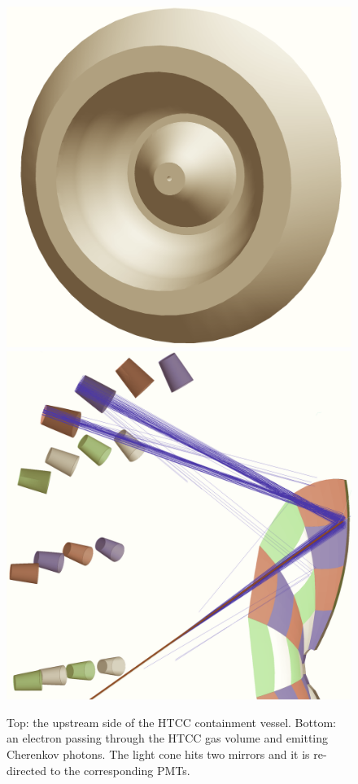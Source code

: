\begin{figure}
	\centering
	\includegraphics[width=0.99\columnwidth,keepaspectratio]{img/htccGeometry.png}
	\includegraphics[width=0.99\columnwidth,keepaspectratio]{img/htccDetail.png}
	\caption{Top: the upstream side of the HTCC containment vessel. Bottom: an electron passing through the HTCC gas volume and emitting Cherenkov photons.
	         The light cone hits two mirrors and it is re-directed to the corresponding PMTs.}
	\label{fig:htccGeometry}
\end{figure}

